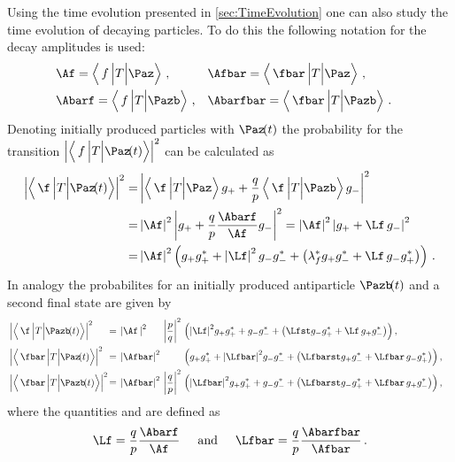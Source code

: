 Using the time evolution presented in \cref{sec:TimeEvolution} one can also study the time evolution of decaying particles.
To do this the following notation for the decay amplitudes is used:
\begin{equation}
\begin{aligned}
&\Af = \left<\,f\,\Big|T\Big|\Paz\right>\,,&&\Afbar = \left<\,\fbar\,\Big|T\Big|\Paz\right>\,,&\\
&\Abarf = \left<\,f\,\Big|T\Big|\Pazb\right>\,,&&\Abarfbar = \left<\,\fbar\,\Big|T\Big|\Pazb\right>\,.&
\end{aligned}
\end{equation}
Denoting initially produced particles with $\Paz\!(t)$ the probability for the transition $\left|\left<\,f\,\Big|T\Big|\Paz\!(t)\right>\right|^2$ can be calculated as
\begin{align}
\left|\left<\,\f\,\Big|T\Big|\Paz\!(t)\right>\right|^2 =&
\left|\left<\,\f\,\Big|T\Big|\Paz\right>g_++\frac{q}{p}\left<\,\f\,\Big|T\Big|\Pazb\right>g_-\right|^2\nonumber\\
=&\left|\Af\right|^2\left|g_+ + \frac{q}{p}\frac{\Abarf}{\Af} g_-\right|^2=\left|\Af\right|^2\left|g_+ +\Lf\,g_-\right|^2\nonumber\\
=&\left|\Af\right|^2\left(g_+g_+^*+\left|\Lf\right|^2g_-g_-^*+\left(\lambda_{f}^*g_+g_-^* + \Lf\, g_-g_+^*\right)\right)\,.
\end{align}
In analogy the probabilites for an initially produced antiparticle $\Pazb\!(t)$ and a second final state \fbar are given by
\begin{align}
&\left|\left<\,\f\,\Big|T\Big|\Pazb\!(t)\right>\right|^2&\kern -8.5pt{=}
&\kern 4.0pt{\left|\Af\,\right|^2}&&\kern -6.5pt{\left|\frac{p}{q}\right|^2}& &\kern -7.0pt{\left(\left|\Lf\right|^2\!g_+g_+^*+g_-g_-^*+\left(\Lfst g_-g_+^* + \Lf\, g_+g_-^*\right)\right)}\,,&\\
&\left|\left<\,\fbar\,\Big|T\Big|\Paz\!(t)\right>\right|^2&\kern -8.5pt{=}
&\kern 4.0pt{\left|\Afbar\right|^2}& && &\kern -7.0pt{\left(g_+g_+^*+\left|\Lfbar\right|^2\!g_-g_-^*+\left(\Lfbarst g_+g_-^* + \Lfbar\, g_-g_+^*\right)\right)}\,,&\\
&\left|\left<\,\fbar\,\Big|T\Big|\Pazb\!(t)\right>\right|^2&\kern -8.5pt{=}
&\kern 4.0pt{\left|\Afbar\right|^2}& &\kern -6.5pt{\left|\frac{q}{p}\right|^2}& &\kern -7.0pt{\left(\left|\Lfbar\right|^2\!g_+g_+^*+g_-g_-^*+\left(\Lfbarst g_-g_+^* + \Lfbar\, g_+g_-^*\right)\right)}\,,&
\end{align}
where the quantities \Lf and \Lfbar are defined as
\begin{equation}
\Lf=\frac{q}{p}\frac{\Abarf}{\Af}\hspace{0.5cm}\text{and}
\hspace{0.5cm}\Lfbar=\frac{q}{p}\frac{\Abarfbar}{\Afbar}\,.\label{eq:defLambdas}
\end{equation}
